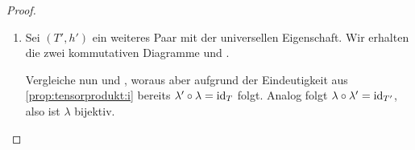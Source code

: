 \documentclass[12pt,a4paper]{scrartcl}
\theoremstyle{cplain}
\theoremstyle{cdef}
\begin{document}
\begin{proof}
\begin{enumerate}[label=\ref{prop:tensorprodukt:\roman*}]
		\item Sei $(T',h')$ ein weiteres Paar mit der universellen Eigenschaft. Wir erhalten die zwei kommutativen Diagramme  und .
		\begin{figure}[H]
			\begin{subfigure}[b]{.235\linewidth}
				\centering
				\caption{}
				\label{prop:tensorprodukt:proof:a}
			\end{subfigure}
			\begin{subfigure}[b]{.24\linewidth}
				\centering
				\caption{}
				\label{prop:tensorprodukt:proof:b}
			\end{subfigure}
			\begin{subfigure}[b]{.25\linewidth}
				\centering
				\caption{}
				\label{prop:tensorprodukt:proof:c}
			\end{subfigure}
			\begin{subfigure}[b]{.235\linewidth}
				\centering
				\caption{}
				\label{prop:tensorprodukt:proof:d}
			\end{subfigure}
		\end{figure}
		Vergleiche nun  und , woraus aber aufgrund der Eindeutigkeit aus \ref{prop:tensorprodukt:i} bereits $\lambda' \circ \lambda = \operatorname{id}_T$ folgt. Analog folgt $\lambda \circ \lambda' = \operatorname{id}_{T'}$, also ist $\lambda$ bijektiv.
		\qedhere
	\end{enumerate}
\end{proof}
\end{document}
